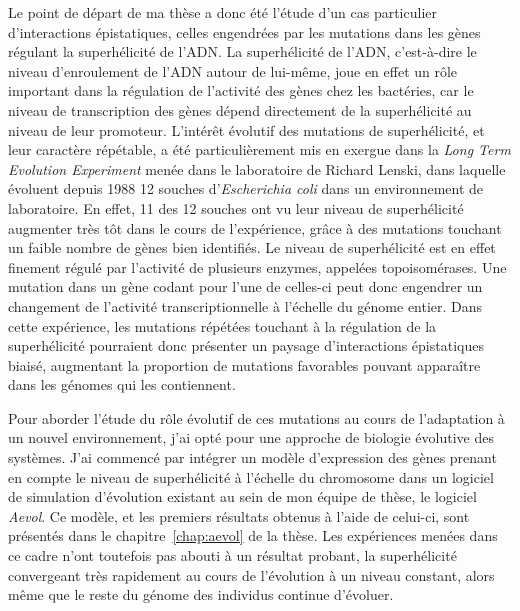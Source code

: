 Le point de départ de ma thèse a donc été l'étude d'un cas particulier d'interactions épistatiques, celles engendrées par les mutations dans les gènes régulant la superhélicité de l'ADN.
La superhélicité de l'ADN, c'est-à-dire le niveau d'enroulement de l'ADN autour de lui-même, joue en effet un rôle important dans la régulation de l'activité des gènes chez les bactéries, car le niveau de transcription des gènes dépend directement de la superhélicité au niveau de leur promoteur.
L'intérêt évolutif des mutations de superhélicité, et leur caractère répétable, a été particulièrement mis en exergue dans la \emph{Long Term Evolution Experiment} menée dans le laboratoire de Richard Lenski, dans laquelle évoluent depuis 1988 12 souches d'\emph{Escherichia coli} dans un environnement de laboratoire.
En effet, 11 des 12 souches ont vu leur niveau de superhélicité augmenter très tôt dans le cours de l'expérience, grâce à des mutations touchant un faible nombre de gènes bien identifiés.
Le niveau de superhélicité est en effet finement régulé par l'activité de plusieurs enzymes, appelées topoisomérases.
Une mutation dans un gène codant pour l'une de celles-ci peut donc engendrer un changement de l'activité transcriptionnelle à l'échelle du génome entier.
Dans cette expérience, les mutations répétées touchant à la régulation de la superhélicité pourraient donc présenter un paysage d'interactions épistatiques biaisé, augmentant la proportion de mutations favorables pouvant apparaître dans les génomes qui les contiennent.

Pour aborder l'étude du rôle évolutif de ces mutations au cours de l'adaptation à un nouvel environnement, j'ai opté pour une approche de biologie évolutive des systèmes.
J'ai commencé par intégrer un modèle d'expression des gènes prenant en compte le niveau de superhélicité à l'échelle du chromosome dans un logiciel de simulation d'évolution existant au sein de mon équipe de thèse, le logiciel \emph{Aevol}.
Ce modèle, et les premiers résultats obtenus à l'aide de celui-ci, sont présentés dans le chapitre~\ref{chap:aevol} de la thèse.
Les expériences menées dans ce cadre n'ont toutefois pas abouti à un résultat probant, la superhélicité convergeant très rapidement au cours de l'évolution à un niveau constant, alors même que le reste du génome des individus continue d'évoluer.

